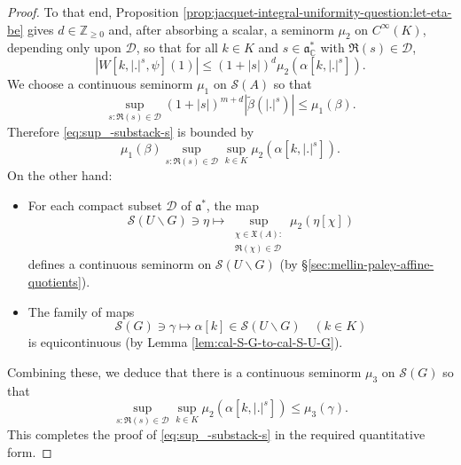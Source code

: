 \begin{proof}
  To that end, Proposition \ref{prop:jacquet-integral-uniformity-question:let-eta-be} gives $d \in \mathbb{Z}_{\geq 0}$ and, after absorbing a scalar, a seminorm $\mu_2$ on $C^\infty(K)$, depending only upon $\mathcal{D}$, so that for all $k \in K$ and $s \in \mathfrak{a}_{\mathbb{C}}^*$ with $\Re(s) \in \mathcal{D}$,
  \begin{equation*}
    |W[k,|.|^s,\psi](1)| \leq (1 + |s|)^d \mu_2(\alpha[k,|.|^s]).
  \end{equation*}
  We choose a continuous seminorm $\mu_1$ on $\mathcal{S}(A)$ so that
  \begin{equation*}
    \sup_{s : \Re(s) \in \mathcal{D}} (1 + |s|)^{m+d} \left\lvert \tilde{\beta}(|.|^s) \right\rvert \leq \mu_1(\beta).
  \end{equation*}
  Therefore \eqref{eq:sup_-substack-s} is bounded by
  \begin{equation*}
    \mu_1(\beta) \sup_{ s : \Re(s) \in \mathcal{D} } \sup_{k \in K} \mu_2(\alpha[k,|.|^s]).
  \end{equation*}
  On the other hand:
  \begin{itemize}
  \item For each compact subset $\mathcal{D}$ of $\mathfrak{a}^*$, the map
    \begin{equation*}
      \mathcal{S}(U \backslash G)
      \ni \eta
      \mapsto \sup_{
        \substack{
          \chi \in \mathfrak{X}(A):  \\
          \Re(\chi) \in \mathcal{D}
        }
      }
      \mu_2(\eta[\chi])
    \end{equation*}
    defines a continuous seminorm on $\mathcal{S}(U \backslash G)$ (by \S\ref{sec:mellin-paley-affine-quotients}).
  \item
    The family of maps
    \begin{equation*}
      \mathcal{S}(G) \ni \gamma \mapsto \alpha[k] \in \mathcal{S}(U \backslash G)
      \quad (k \in K)
    \end{equation*}
    is equicontinuous (by Lemma \ref{lem:cal-S-G-to-cal-S-U-G}).
  \end{itemize}
  Combining these, we deduce that there is a continuous seminorm $\mu_3$ on $\mathcal{S}(G)$ so that
  \begin{equation*}
    \sup_{ s : \Re(s) \in \mathcal{D} } \sup_{k \in K} \mu_2(\alpha[k,|.|^s]) \leq \mu_3(\gamma).
  \end{equation*}
  This completes the proof of \eqref{eq:sup_-substack-s} in the required quantitative form.
\end{proof}
